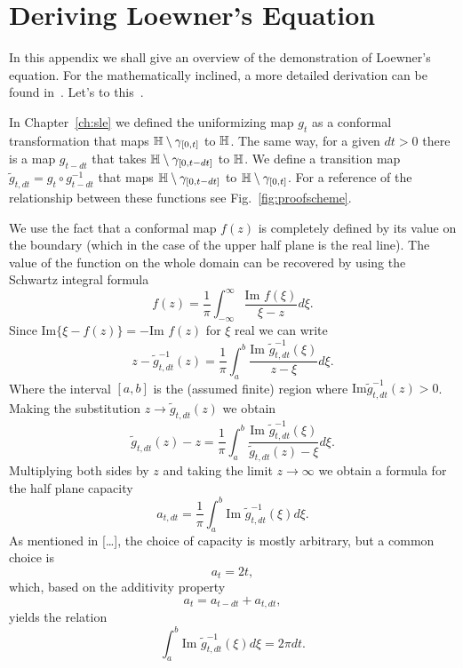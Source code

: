 \chapter{Deriving Loewner's Equation}
\label{sub:proof}

In this appendix we shall give an overview of the demonstration of Loewner's
equation. For the mathematically inclined, a more detailed derivation can be
found in~\cite{delMonaco2013}. Let's to this~\cite{Kager2004}.

In Chapter~\ref{ch:sle} we defined the uniformizing map $g_t$ as a conformal
transformation that maps $\mathbb{H}\setminus\gamma_{[0,t]}$ to $\mathbb{H}$. The same way,
for a given $dt>0$ there is a map $g_{t-dt}$ that takes
$\mathbb{H}\setminus\gamma_{[0,t-dt]}$ to $\mathbb{H}$. We define a transition map
$\tilde{g}_{t,dt}=g_t\circ g_{t-dt}^{-1}$ that maps
$\mathbb{H}\setminus\gamma_{[0,t-dt]}$ to $\mathbb{H}\setminus\gamma_{[0,t]}$. For a
reference of the relationship between these functions see
Fig.~\ref{fig:proofscheme}.


We use the fact that a conformal map $f(z)$ is completely defined by its value
on the boundary (which in the case of the upper half plane is the real line).
The value of the function on the whole domain can be recovered by using the
Schwartz integral formula
\begin{equation}
    f\left(z\right)=
    \frac{1}{\pi}\int_{-\infty}^{\infty}
    \frac{\mbox{Im }f\left(\xi\right)}{\xi-z}d\xi.
\end{equation}
Since $\mbox{Im}\{\xi - f(z)\}=-\mbox{Im }f(z)$ for $\xi$ real we can write
\begin{equation}
    z-\tilde{g}_{t,dt}^{-1}\left(z\right)=
    \frac{1}{\pi}\int_{a}^{b}
    \frac{\mbox{Im }\tilde{g}_{t,dt}^{-1}\left(\xi\right)}{z-\xi}d\xi.
\end{equation}
Where the interval $[a,b]$ is the (assumed finite) region where $\mbox{Im
}\tilde{g}_{t,dt}^{-1}(z)>0$. Making the substitution
$z\rightarrow\tilde{g}_{t,dt}(z)$ we obtain
\begin{equation}
    \label{eq:proof1}
    \tilde{g}_{t,dt}\left(z\right)-z=
    \frac{1}{\pi}\int_{a}^{b}
    \frac{\mbox{Im }\tilde{g}_{t,dt}^{-1}\left(\xi\right)}
    {\tilde{g}_{t,dt}\left(z\right)-\xi}d\xi.
\end{equation}
Multiplying both sides by $z$ and taking the limit $z\rightarrow\infty$ we
obtain a formula for the half plane capacity
\begin{equation}
    a_{t,dt}=\frac{1}{\pi}\int_{a}^{b}
    \mbox{Im }\tilde{g}_{t,dt}^{-1}\left(\xi\right)d\xi.
\end{equation}
As mentioned in [\ldots], the choice of capacity is mostly arbitrary, but a
common choice is
\begin{equation}
    a_t = 2t,
\end{equation}
which, based on the additivity property
\begin{equation}
    a_t = a_{t-dt} + a_{t,dt},
\end{equation}
yields the relation
\begin{equation}
    \label{eq:proof2}
    \int_{a}^{b}\mbox{Im }\tilde{g}_{t,dt}^{-1}\left(\xi\right)d\xi=2\pi dt.
\end{equation}

